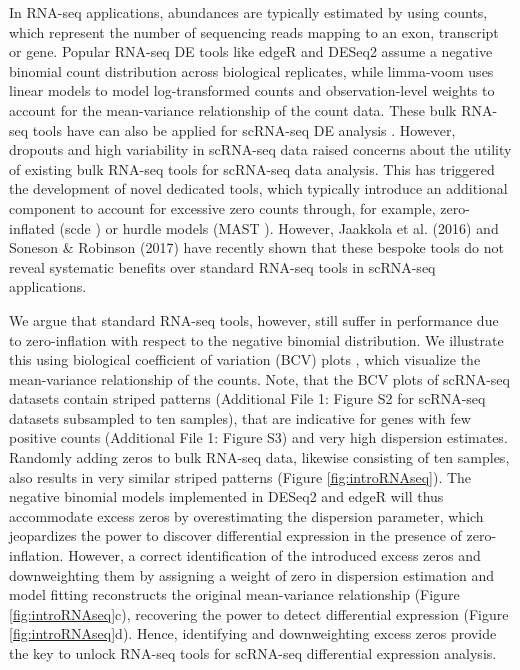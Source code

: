 \documentclass{bmcart}
\begin{document}
In RNA-seq applications, abundances are typically estimated by using counts, which represent the number of sequencing reads mapping to an exon, transcript or gene.
Popular RNA-seq DE tools like edgeR \cite{Robinson2010a} and DESeq2 \cite{Love2014} assume a negative binomial count distribution across biological replicates, while limma-voom \cite{Law2014} uses linear models to model log-transformed counts and observation-level weights to account for the mean-variance relationship of the count data.
These bulk RNA-seq tools have can also be applied for scRNA-seq DE analysis \cite{Lun2016} .
However, dropouts and high variability in scRNA-seq data raised concerns about the utility of existing bulk RNA-seq tools for  scRNA-seq data analysis.
This has triggered the development of novel dedicated tools, which typically introduce an additional component to account for excessive zero counts through, for example, zero-inflated (scde \cite{Kharchenko2014}) or hurdle models (MAST \cite{Finak2015}).
However, Jaakkola et al. (2016) \cite{Jaakkola2016} and Soneson \& Robinson (2017) \cite{Soneson2017} have recently shown that these bespoke tools do not reveal systematic benefits over standard RNA-seq tools in scRNA-seq applications.


We argue that standard RNA-seq tools, however, still suffer in performance due to zero-inflation with respect to the negative binomial distribution.
We illustrate this using biological coefficient of variation (BCV) plots \cite{McCarthy2012}, which visualize the mean-variance relationship of the counts.
Note, that the BCV plots of scRNA-seq datasets contain striped patterns (Additional File 1: Figure S2 for scRNA-seq datasets subsampled to ten samples), that are indicative for genes with few positive counts (Additional File 1: Figure S3) and very high dispersion estimates.
Randomly adding zeros to bulk RNA-seq data, likewise consisting of ten samples, also results in very similar striped patterns (Figure \ref{fig:introRNAseq}).
The negative binomial models implemented in DESeq2 and edgeR will thus accommodate excess zeros by overestimating the dispersion parameter, which jeopardizes the power to discover differential expression in the presence of zero-inflation.
However, a correct identification of the introduced excess zeros and downweighting them by assigning a weight of zero in dispersion estimation and model fitting reconstructs the original mean-variance relationship (Figure \ref{fig:introRNAseq}c), recovering the power to detect differential expression (Figure \ref{fig:introRNAseq}d).
Hence, identifying and downweighting excess zeros provide the key to unlock RNA-seq tools for scRNA-seq differential expression analysis.
\end{document}
